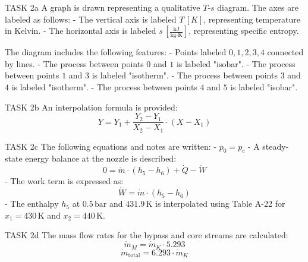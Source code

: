 TASK 2a  
A graph is drawn representing a qualitative \( T \)-\( s \) diagram. The axes are labeled as follows:  
- The vertical axis is labeled \( T \, [K] \), representing temperature in Kelvin.  
- The horizontal axis is labeled \( s \, [\frac{\text{kJ}}{\text{kg·K}}] \), representing specific entropy.  

The diagram includes the following features:  
- Points labeled \( 0, 1, 2, 3, 4 \) connected by lines.  
- The process between points \( 0 \) and \( 1 \) is labeled "isobar".  
- The process between points \( 1 \) and \( 3 \) is labeled "isotherm".  
- The process between points \( 3 \) and \( 4 \) is labeled "isotherm".  
- The process between points \( 4 \) and \( 5 \) is labeled "isobar".  

TASK 2b  
An interpolation formula is provided:  
\[
Y = Y_1 + \frac{Y_2 - Y_1}{X_2 - X_1} \cdot (X - X_1)
\]

TASK 2c  
The following equations and notes are written:  
- \( p_0 = p_c \)  
- A steady-state energy balance at the nozzle is described:  
\[
0 = \dot{m} \cdot (h_5 - h_6) + \dot{Q} - \dot{W}
\]
- The work term is expressed as:  
\[
\dot{W} = \dot{m} \cdot (h_5 - h_6)
\]
- The enthalpy \( h_5 \) at \( 0.5 \, \text{bar} \) and \( 431.9 \, \text{K} \) is interpolated using Table A-22 for \( x_1 = 430 \, \text{K} \) and \( x_2 = 440 \, \text{K} \).

TASK 2d  
The mass flow rates for the bypass and core streams are calculated:  
\[
\dot{m}_M = \dot{m}_K \cdot 5.293
\]
\[
\dot{m}_{\text{total}} = 6.293 \cdot \dot{m}_K
\]